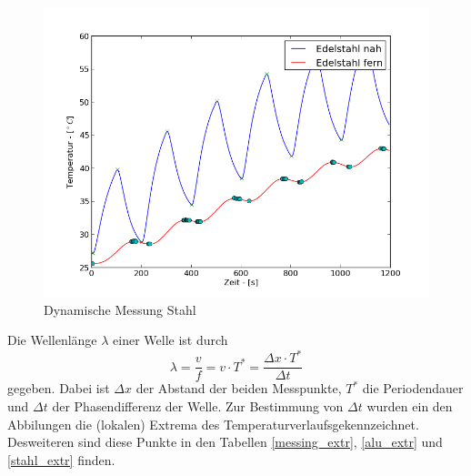 \documentclass[11pt]{article}
\begin{document}
\begin{figure}[htp]
\centering
\includegraphics[width=\textwidth]{Diagramme/dyn_stahl.png}
\caption{Dynamische Messung Stahl}
\label{dyn_stahl}
\end{figure}\noindent
Die Wellenl\"ange $\lambda$ einer Welle ist durch
\begin{equation}
\lambda = \frac{v}{f} = v\cdot T^* = \frac{\Delta x\cdot  T^* }{\Delta t}
\end{equation}
gegeben. Dabei ist $\Delta x$ der Abstand der beiden Messpunkte, $T^*$ die Periodendauer und $\Delta t$ der Phasendifferenz der Welle. Zur Bestimmung von $\Delta t$ wurden ein den Abbilungen die (lokalen) Extrema des Temperaturverlaufsgekennzeichnet. Desweiteren sind diese Punkte in den Tabellen \ref{messing_extr}, \ref{alu_extr} und \ref{stahl_extr} finden.
\end{document}
